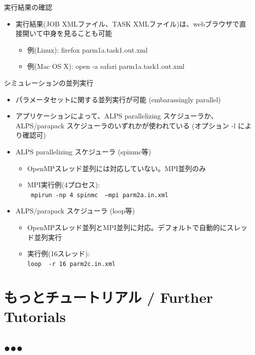 \begin{frame}[t,fragile]{実行結果の確認}
  \begin{itemize}
    \item 実行結果(JOB XMLファイル、TASK XMLファイル)は、webブラウザで直接開いて中身を見ることも可能
      \begin{itemize}
      \item 例(Linux): firefox parm1a.task1.out.xml
      \item 例(Mac OS X): open -a safari parm1a.task1.out.xml
      \end{itemize}
  \end{itemize}
\end{frame}

\begin{frame}[t,fragile]{シミュレーションの並列実行}
  \begin{itemize}
    \item パラメータセットに関する並列実行が可能 (embarassingly parallel)
    \item アプリケーションによって、ALPS parallelizing スケジューラか、ALPS/parapack スケジューラのいずれかが使われている (オプション -l により確認可)
    \item ALPS parallelizing スケジューラ (spinmc等)
      \begin{itemize}
        \item OpenMPスレッド並列には対応していない。MPI並列のみ
        \item MPI実行例(4プロセス): \\ {\tt {\color{red} mpirun -np 4} spinmc {\color{red} --mpi} parm2a.in.xml}
      \end{itemize}
    \item ALPS/parapack スケジューラ (loop等)
      \begin{itemize}
        \item OpenMPスレッド並列とMPI並列に対応。デフォルトで自動的にスレッド並列実行
        \item 実行例(16スレッド): \\ {\tt loop {\color{red} -r 16} parm2c.in.xml}
      \end{itemize}
  \end{itemize}
\end{frame}

\section{もっとチュートリアル / Further Tutorials}
\subsection*{{\protect\color{red}●}{\protect\color{blue}●}{\protect\color{green}●}}

